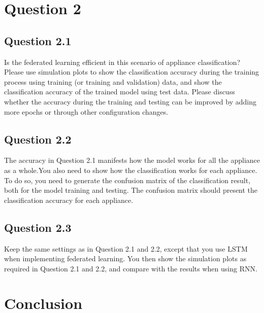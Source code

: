 \documentclass[a4paper, article, oneside, USenglish, IN5460]{memoir}
\begin{document}
\chapter{Question 2}

\section{Question 2.1}

Is the federated learning efficient in this scenario of appliance classification? Please use simulation plots to show the classification accuracy during the training process using training (or training and validation) data, and show the classification accuracy of the trained model using test data. Please discuss whether the accuracy during the training and testing can be improved by adding more epochs or through other configuration changes.

\section{Question 2.2}

The accuracy in Question 2.1 manifests how the model works for all the appliance as a whole.You also need to show how the classification works for each appliance. To do so, you need to generate the confusion matrix of the classification result, both for the model training and testing. The confusion matrix should present the classification accuracy for each appliance.

\section{Question 2.3}

Keep the same settings as in Question 2.1 and 2.2, except that you use LSTM when implementing federated learning. You then show the simulation plots as required in Question 2.1 and 2.2, and compare with the results when using RNN.

\chapter{Conclusion}



\vspace*{10mm}
\end{document}
